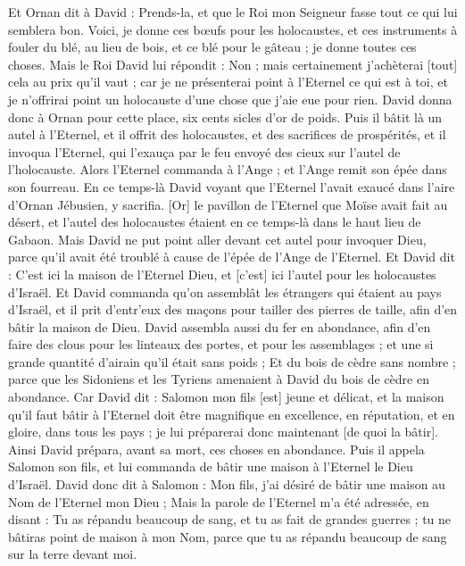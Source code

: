 \begin{multicols}{2}
Et Ornan dit à David : Prends-la, et que le Roi mon Seigneur fasse tout ce qui lui semblera bon. Voici, je donne ces bœufs pour les holocaustes, et ces instruments à fouler du blé, au lieu de bois, et ce blé pour le gâteau ; je donne toutes ces choses.
Mais le Roi David lui répondit : Non ; mais certainement j'achèterai [tout] cela au prix qu'il vaut ; car je ne présenterai point à l'Eternel ce qui est à toi, et je n'offrirai point un holocauste d'une chose que j'aie eue pour rien.
David donna donc à Ornan pour cette place, six cents sicles d'or de poids.
Puis il bâtit là un autel à l'Eternel, et il offrit des holocaustes, et des sacrifices de prospérités, et il invoqua l'Eternel, qui l'exauça par le feu envoyé des cieux sur l'autel de l'holocauste.
Alors l'Eternel commanda à l'Ange ; et l'Ange remit son épée dans son fourreau.
En ce temps-là David voyant que l'Eternel l'avait exaucé dans l'aire d'Ornan Jébusien, y sacrifia.
[Or] le pavillon de l'Eternel que Moïse avait fait au désert, et l'autel des holocaustes étaient en ce temps-là dans le haut lieu de Gabaon.
Mais David ne put point aller devant cet autel pour invoquer Dieu, parce qu'il avait été troublé à cause de l'épée de l'Ange de l'Eternel.
\VerseOne{}Et David dit : C'est ici la maison de l'Eternel Dieu, et [c'est] ici l'autel pour les holocaustes d'Israël.
Et David commanda qu'on assemblât les étrangers qui étaient au pays d'Israël, et il prit d'entr'eux des maçons pour tailler des pierres de taille, afin d'en bâtir la maison de Dieu.
David assembla aussi du fer en abondance, afin d'en faire des clous pour les linteaux des portes, et pour les assemblages ; et une si grande quantité d'airain qu'il était sans poids ;
Et du bois de cèdre sans nombre ; parce que les Sidoniens et les Tyriens amenaient à David du bois de cèdre en abondance.
Car David dit : Salomon mon fils [est] jeune et délicat, et la maison qu'il faut bâtir à l'Eternel doit être magnifique en excellence, en réputation, et en gloire, dans tous les pays ; je lui préparerai donc maintenant [de quoi la bâtir]. Ainsi David prépara, avant sa mort, ces choses en abondance.
Puis il appela Salomon son fils, et lui commanda de bâtir une maison à l'Eternel le Dieu d'Israël.
David donc dit à Salomon : Mon fils, j'ai désiré de bâtir une maison au Nom de l'Eternel mon Dieu ;
Mais la parole de l'Eternel m'a été adressée, en disant : Tu as répandu beaucoup de sang, et tu as fait de grandes guerres ; tu ne bâtiras point de maison à mon Nom, parce que tu as répandu beaucoup de sang sur la terre devant moi.

\end{multicols}
